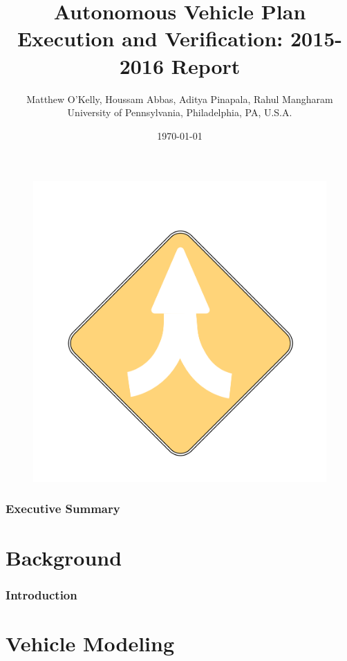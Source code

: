 \documentclass[11pt]{article}              %
\title{Autonomous Vehicle Plan Execution and Verification: 2015-2016 Report}   %
\author{Matthew O'Kelly, Houssam Abbas, Aditya Pinapala, Rahul Mangharam \\ \large University of Pennsylvania,
	Philadelphia, PA, U.S.A.\\}              %
\date{\today}                           %
\begin{document}

\begin{figure}
	\centering
	\includegraphics[scale=0.25]{figures/apexlogo}
\end{figure}

\maketitle                              %

\pagebreak
\section*{Executive Summary}
\pagebreak
\tableofcontents                        %
\pagebreak
\part{Background}
\section{Introduction}
 
\pagebreak
\part{Vehicle Modeling}
\end{document}
